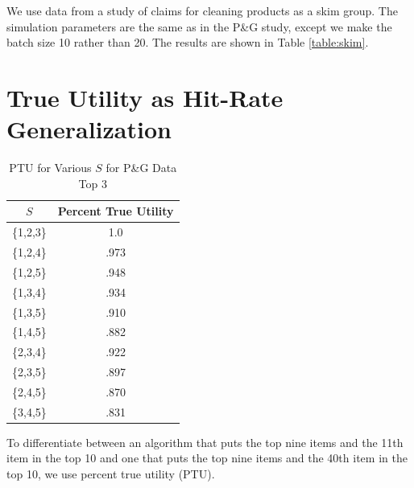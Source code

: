 \documentclass[nonblindrev]{informs3}
\begin{document}
We use data from a study of claims for cleaning products as a skim group. The simulation parameters are the same as in the P\&G study, except we make the batch size 10 rather than 20. The results are shown in Table \ref{table:skim}.

\section{True Utility as Hit-Rate Generalization}
\begin{table}
\caption{PTU for Various $S$ for P\&G Data Top 3}
\begin{center}
\begin{tabular}{c | c }
$S$& Percent True Utility \\
\hline
\{1,2,3\}& 1.0 \\
\{1,2,4\}&.973 \\
\{1,2,5\}&.948 \\
\{1,3,4\}&.934 \\
\{1,3,5\}&.910 \\
\{1,4,5\}&.882 \\
\{2,3,4\}&.922 \\
\{2,3,5\}&.897 \\
\{2,4,5\}&.870 \\
\{3,4,5\}&.831 \\
\hline
\end{tabular}
\end{center}
\label{table:PTU}
\end{table}
To differentiate between an algorithm that puts the top nine items and the 11th item in the top 10 and one that puts the top nine items and the 40th item in the top 10, we use percent true utility (PTU).
\end{document}
